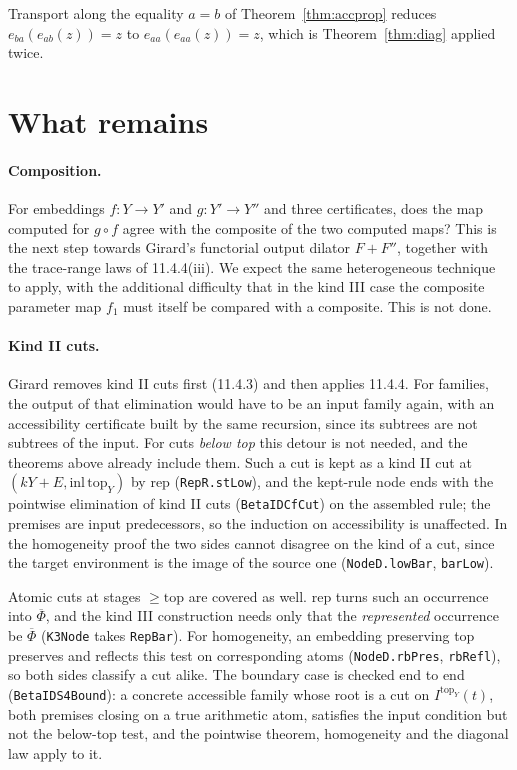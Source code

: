 \documentclass[11pt]{article}
\theoremstyle{remark}
\newcommand{\Phib}{\overline{\Phi}}
\begin{document}
Transport along the equality $a=b$ of Theorem~\ref{thm:accprop} reduces
$e_{ba}(e_{ab}(z))=z$ to $e_{aa}(e_{aa}(z))=z$, which is
Theorem~\ref{thm:diag} applied twice.

\section{What remains}

\paragraph{Composition.} For embeddings $f:Y\to Y'$ and $g:Y'\to Y''$ and
three certificates, does the map computed for $g\circ f$ agree with the
composite of the two computed maps? This is the next step towards
Girard's functorial output dilator $F+F''$, together with the trace-range
laws of 11.4.4(iii). We expect the same heterogeneous technique to apply,
with the additional difficulty that in the kind III case the composite
parameter map $f_1$ must itself be compared with a composite. This is not
done.

\paragraph{Kind II cuts.} Girard removes kind II cuts first (11.4.3) and
then applies 11.4.4. For families, the output of that elimination would
have to be an input family again, with an accessibility certificate built
by the same recursion, since its subtrees are not subtrees of the input.
For cuts \emph{below top} this detour is not needed, and the theorems
above already include them. Such a cut is kept as a kind II cut at
$(kY+E,\mathrm{inl}\,\mathrm{top}_Y)$ by $\mathrm{rep}$
(\texttt{RepR.stLow}), and the kept-rule node ends with the pointwise
elimination of kind II cuts (\texttt{BetaIDCfCut}) on the assembled rule;
the premises are input predecessors, so the induction on accessibility is
unaffected. In the homogeneity proof the two sides cannot disagree on the
kind of a cut, since the target environment is the image of the source
one (\texttt{NodeD.lowBar}, \texttt{barLow}).

Atomic cuts at stages $\geq\mathrm{top}$ are covered as well. $\mathrm{rep}$
turns such an occurrence into $\Phib$, and the kind III construction needs
only that the \emph{represented} occurrence be $\Phib$
(\texttt{K3Node} takes \texttt{RepBar}). For homogeneity, an embedding
preserving top preserves and reflects this test on corresponding atoms
(\texttt{NodeD.rbPres}, \texttt{rbRefl}), so both sides classify a cut
alike. The boundary case is checked end to end
(\texttt{BetaIDS4Bound}): a concrete accessible family whose root is a cut
on $I^{\mathrm{top}_Y}(t)$, both premises closing on a true arithmetic
atom, satisfies the input condition but not the below-top test, and the
pointwise theorem, homogeneity and the diagonal law apply to it.
\end{document}
